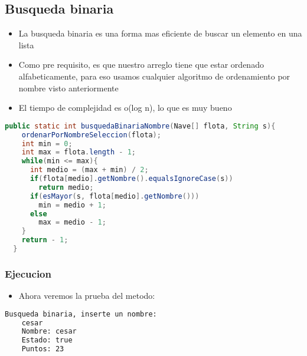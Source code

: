 \subsection{Busqueda binaria}
\begin{itemize}
    \item La busqueda binaria es una forma mas eficiente de buscar un elemento en una lista
    \item Como pre requisito, es que nuestro arreglo tiene que estar ordenado alfabeticamente, para eso usamos cualquier algoritmo de ordenamiento por nombre visto anteriormente
    \item El tiempo de complejidad es o(log n), lo que es muy bueno
\end{itemize}
\begin{lstlisting}[language=java, caption={Metodo para hacer una busqueda binaria}]
      public static int busquedaBinariaNombre(Nave[] flota, String s){
    ordenarPorNombreSeleccion(flota);
    int min = 0;
    int max = flota.length - 1;
    while(min <= max){
      int medio = (max + min) / 2;
      if(flota[medio].getNombre().equalsIgnoreCase(s))
        return medio;
      if(esMayor(s, flota[medio].getNombre()))
        min = medio + 1;
      else
        max = medio - 1;
    }
    return - 1;
  }
\end{lstlisting}
\subsubsection{Ejecucion}
\begin{itemize}
    \item Ahora veremos la prueba del metodo:
\end{itemize}
    \begin{lstlisting}[language=bash, caption={Prueba del metodo}]
    Busqueda binaria, inserte un nombre:
    cesar
    Nombre: cesar
    Estado: true
    Puntos: 23
\end{lstlisting}



